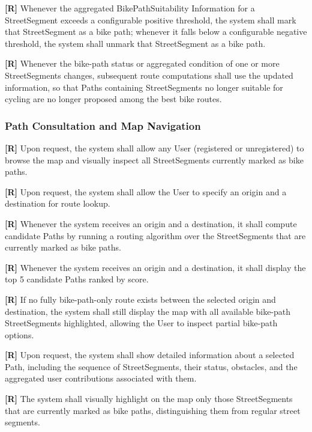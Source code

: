 \textbf{[R\creq]} Whenever the aggregated BikePathSuitability Information for a 
StreetSegment exceeds a configurable positive threshold, the system shall mark that 
StreetSegment as a bike path; whenever it falls below a configurable negative threshold, 
the system shall unmark that StreetSegment as a bike path.

\textbf{[R\creq]} Whenever the bike-path status or aggregated condition of one or more StreetSegments changes, subsequent route computations shall use the updated information, so that Paths containing StreetSegments no longer suitable for cycling are no longer proposed among the best bike routes.


\subsubsection*{Path Consultation and Map Navigation}

\textbf{[R\creq]} Upon request, the system shall allow any User (registered or unregistered) to browse the map and visually inspect all StreetSegments currently marked as bike paths.

\textbf{[R\creq]} Upon request, the system shall allow the User to specify an origin and a destination for route lookup.

\textbf{[R\creq]} Whenever the system receives an origin and a destination, it shall compute candidate Paths by running a routing algorithm over the StreetSegments that are currently marked as bike paths.

\textbf{[R\creq]} Whenever the system receives an origin and a destination, it shall display the top 5 candidate Paths ranked by score.

\textbf{[R\creq]} If no fully bike-path-only route exists between the selected origin and destination, the system shall still display the map with all available bike-path StreetSegments highlighted, allowing the User to inspect partial bike-path options.

\textbf{[R\creq]} Upon request, the system shall show detailed information about a selected Path, including the sequence of StreetSegments, their status, obstacles, and the aggregated user contributions associated with them.

\textbf{[R\creq]} The system shall visually highlight on the map only those StreetSegments
that are currently marked as bike paths, distinguishing them from regular street segments.



